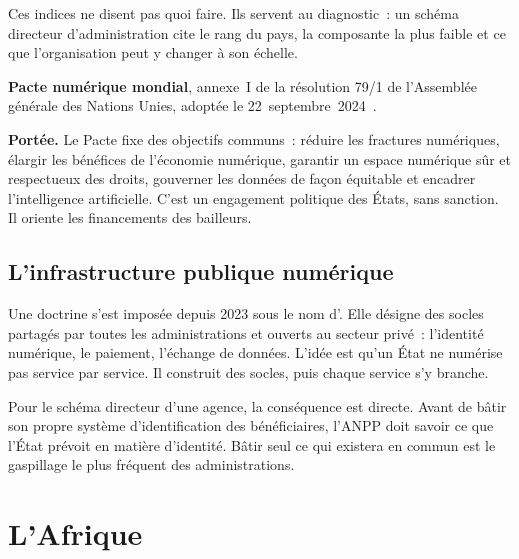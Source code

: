 Ces indices ne disent pas quoi faire. Ils servent au diagnostic~: un schéma directeur d'administration cite le
rang du pays, la composante la plus faible et ce que l'organisation peut y changer à son échelle.

\begin{boxjuris}
\textbf{Pacte numérique mondial}, annexe~I de la résolution 79/1 de l'Assemblée générale des Nations Unies,
adoptée le 22~septembre~2024~\cite{onu2024pacte}.

\smallskip
\textbf{Portée.} Le Pacte fixe des objectifs communs~: réduire les fractures numériques, élargir les bénéfices
de l'économie numérique, garantir un espace numérique sûr et respectueux des droits, gouverner les données de
façon équitable et encadrer l'intelligence artificielle. C'est un engagement politique des États, sans
sanction. Il oriente les financements des bailleurs.
\end{boxjuris}

\subsection{L'infrastructure publique numérique}

Une doctrine s'est imposée depuis 2023 sous le nom d'. Elle désigne
des socles partagés par toutes les administrations et ouverts au secteur privé~: l'identité numérique, le
paiement, l'échange de données. L'idée est qu'un État ne numérise pas service par service. Il construit des
socles, puis chaque service s'y branche.

Pour le schéma directeur d'une agence, la conséquence est directe. Avant de bâtir son propre système
d'identification des bénéficiaires, l'ANPP doit savoir ce que l'État prévoit en matière d'identité. Bâtir seul
ce qui existera en commun est le gaspillage le plus fréquent des administrations.

\section{L'Afrique}
\label{sec:c05-afrique}

